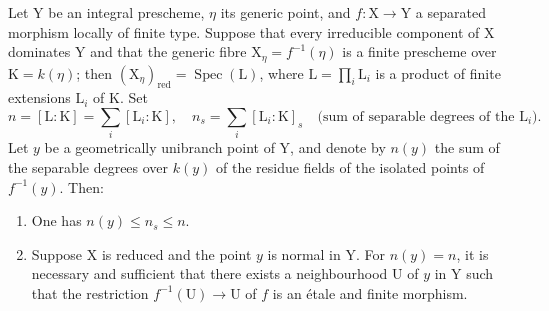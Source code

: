 \begin{theorem}[18.10.16]
\label{IV.18.10.16}
Let $\mathrm{Y}$ be an integral prescheme, $\eta$ its generic point, and $f:\mathrm{X}\to\mathrm{Y}$ a separated morphism locally of finite type.
Suppose that every irreducible component of $\mathrm{X}$ dominates $\mathrm{Y}$ and that the generic fibre $\mathrm{X}_\eta=f^{-1}(\eta)$ is a finite prescheme over $\mathrm{K}=k(\eta)$; then $(\mathrm{X}_\eta)_{\mathrm{red}}=\operatorname{Spec}(\mathrm{L})$, where $\mathrm{L}=\prod_i\mathrm{L}_i$ is a product of finite extensions $\mathrm{L}_i$ of $\mathrm{K}$.
Set
\[
  n=[\mathrm{L}:\mathrm{K}]=\sum_i[\mathrm{L}_i:\mathrm{K}],\quad n_s=\sum_i[\mathrm{L}_i:\mathrm{K}]_s\quad\text{(sum of separable degrees of the $\mathrm{L}_i$)}.
\]
Let $y$ be a geometrically unibranch point of $\mathrm{Y}$, and denote by $n(y)$ the sum of the separable degrees over $k(y)$ of the residue fields of the isolated points of $f^{-1}(y)$.
Then:
\begin{enumerate}[label=(\roman*)]
  \item One has $n(y)\leq n_s\leq n$.
  \item Suppose $\mathrm{X}$ is reduced and the point $y$ is normal in $\mathrm{Y}$.
For $n(y)=n$, it is necessary and sufficient that there exists a neighbourhood $\mathrm{U}$ of $y$ in $\mathrm{Y}$ such that the restriction $f^{-1}(\mathrm{U})\to\mathrm{U}$ of $f$ is an \'etale and finite morphism.
\end{enumerate}
\end{theorem}

